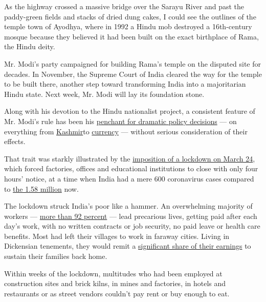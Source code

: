 As the highway crossed a massive bridge over the Sarayu River and past
the paddy-green fields and stacks of dried dung cakes, I could see the
outlines of the temple town of Ayodhya, where in 1992 a Hindu mob
destroyed a 16th-century mosque because they believed it had been built
on the exact birthplace of Rama, the Hindu deity.

Mr. Modi's party campaigned for building Rama's temple on the disputed
site for decades. In November, the Supreme Court of India cleared the
way for the temple to be built there, another step toward transforming
India into a majoritarian Hindu state. Next week, Mr. Modi will lay its
foundation stone.

Along with his devotion to the Hindu nationalist project, a consistent
feature of Mr. Modi's rule has been his
\href{https://www.nytimes.com/2020/05/27/opinion/india-modi-coronavirus.html}{penchant
for dramatic policy decisions} --- on everything from
\href{https://www.nytimes.com/2019/08/15/opinion/sunday/kashmir-siege-modi.html}{Kashmir}to
\href{https://www.nytimes.com/2016/11/27/opinion/in-india-black-money-makes-for-bad-policy.html}{currency}
--- without serious consideration of their effects.

That trait was starkly illustrated by the
\href{https://www.nytimes.com/2020/03/25/opinion/india-coronavirus-lockdown.html}{imposition
of a lockdown on March 24}, which forced factories, offices and
educational institutions to close with only four hours' notice, at a
time when India had a mere 600 coronavirus cases compared to
\href{https://www.ndtv.com/india-news/coronavirus-over-50-000-cases-in-india-in-24-hours-for-the-first-time-15-83-lakh-total-cases-so-far-over-10-lakh-recoveries-2271144}{the
1.58 million} now.

The lockdown struck India's poor like a hammer. An overwhelming majority
of workers ---
\href{https://www.magzter.com/article/Business/Forbes-India/Work-In-Progress}{more
than 92 percent} --- lead precarious lives, getting paid after each
day's work, with no written contracts or job security, no paid leave or
health care benefits. Most had left their villages to work in faraway
cities. Living in Dickensian tenements, they would remit a
\href{https://www.livemint.com/news/india/why-india-s-migrants-deserve-a-better-deal-11589818749274.html}{significant
share of their earnings} to sustain their families back home.

Within weeks of the lockdown, multitudes who had been employed at
construction sites and brick kilns, in mines and factories, in hotels
and restaurants or as street vendors couldn't pay rent or buy enough to
eat.

